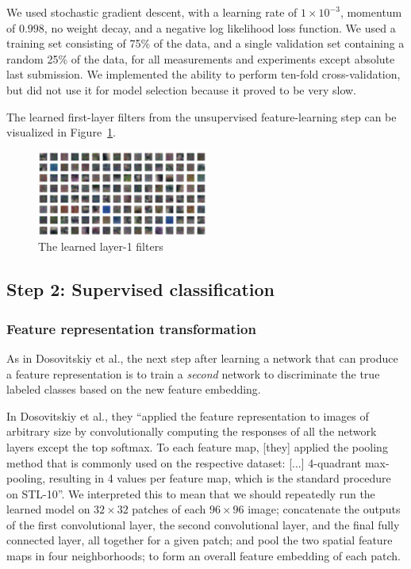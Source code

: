 \documentclass{article} %
\begin{document}
We used stochastic gradient descent, with a learning rate of $1 \times 10^{-3}$, momentum of $0.998$, no weight decay, and a negative log likelihood loss function. We used a training set consisting of 75\% of the data, and a single validation set containing a random 25\% of the data, for all measurements and experiments except absolute last submission. We implemented the ability to perform ten-fold cross-validation, but did not use it for model selection because it proved to be very slow.

The learned first-layer filters from the unsupervised feature-learning step can be visualized in Figure~\ref{figfilt}.

\begin{figure}[h]
\centering
\includegraphics[width=0.5\textwidth]{figs/filter_sur.png}
\caption{The learned layer-1 filters}
\label{figfilt}
\end{figure}


\subsection{Step 2: Supervised classification}

\subsubsection{Feature representation transformation}

As in Dosovitskiy et al., the next step after learning a network that can produce a feature representation is to train a \emph{second} network to discriminate the true labeled classes based on the new feature embedding.

In Dosovitskiy et al., they ``applied the feature representation to images of arbitrary size by convolutionally computing the
responses of all the network layers except the top softmax. To each feature map, [they] applied the pooling method that is commonly used on the respective dataset: [...] 4-quadrant max-pooling, resulting in 4 values per feature map, which is the standard procedure on STL-10''. We interpreted this to mean that we should repeatedly run the learned model on $32\times32$ patches of each $96\times96$ image; concatenate the outputs of the first convolutional layer, the second convolutional layer, and the final fully connected layer, all together for a given patch; and pool the two spatial feature maps in four neighborhoods; to form an overall feature embedding of each patch.
\end{document}
